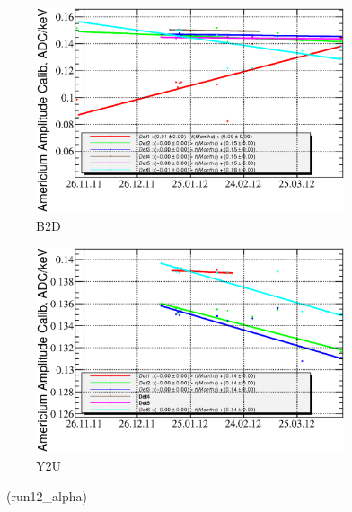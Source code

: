 \documentclass[a4paper,12pt]{article}
\begin{document}
\begin{figure}[htb]
\begin{subfigure}[t]{0.49\textwidth}
\includegraphics[width=\textwidth]{gfx/run12_alpha/B2D/c_chAmGain_by_day_B2D.eps}
\caption{B2D}
\end{subfigure}
%
\hfill
%
\begin{subfigure}[t]{0.49\textwidth}
\includegraphics[width=\textwidth]{gfx/run12_alpha/Y2U/c_chAmGain_by_day_Y2U.eps}
\caption{Y2U}
\end{subfigure}
%
\caption{\amgainlabel\ (run12\_alpha)}
\end{figure}
\end{document}
